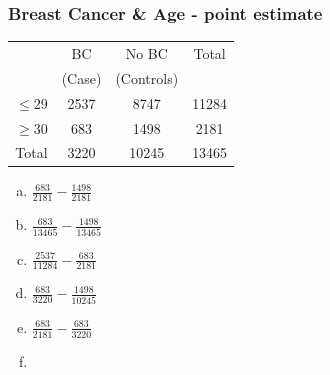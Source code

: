 \documentclass[11pt,containsverbatim,handout,xcolor=xelatex,dvipsnames,table]{beamer}
\newcommand{\solnMult}[1]{#1}
\begin{document}
\begin{frame}
\frametitle{Breast Cancer \& Age - point estimate}


{\small
\begin{center}
\begin{tabular}{r|c|c|c}
         & BC  & No BC & Total           \\
         & (Case)          & (Controls)       &                 \\
\hline
$\le 29$ & {2537} & {8747}  & {11284}\\
$\ge 30$ & {683}  & {1498}  & {2181} \\
\hline
Total    &{3220} &{10245} & {13465}\\
\end{tabular}
\end{center}
}

\begin{multicols}{2}
\begin{enumerate}[(a)]
\item $\frac{683}{2181} - \frac{1498}{2181}$
\item $\frac{683}{13465} - \frac{1498}{13465}$
\item $\frac{2537}{11284} - \frac{683}{2181}$
\item \solnMult{ $\frac{683}{3220} - \frac{1498}{10245}$} 
\item $\frac{683}{2181} - \frac{683}{3220}$
\item[]
\end{enumerate}
\end{multicols}

\end{frame}

\end{document}
